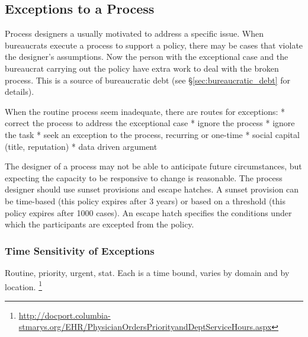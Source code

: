 \subsection{Exceptions to a Process\label{sec:exceptions-to-process}}


Process designers a usually motivated to address a specific issue. When bureaucrats execute a process to support a policy, there may be cases that violate the designer's assumptions. Now the person with the exceptional case and the bureaucrat carrying out the policy have extra work to deal with the broken process. This is a source of bureaucratic debt (see \S\ref{sec:bureaucratic_debt} for details). 

When the routine process seem inadequate, there are routes for exceptions:
* correct the process to address the exceptional case
* ignore the process
* ignore the task
* seek an exception to the process, recurring or one-time
  * social capital (title, reputation)
  * data driven argument 

The designer of a process may not be able to anticipate future circumstances, but expecting the capacity to be responsive to change is reasonable. The process designer should use sunset provisions and escape hatches.  
A sunset provision can be time-based (this policy expires after 3 years) or based on a threshold (this policy expires after 1000 cases). An escape hatch specifies the conditions under which the participants are excepted from the policy. 

\subsubsection{Time Sensitivity of Exceptions}
Routine, priority, urgent, stat. 
Each is a time bound, varies by domain and by location.
\footnote{\href{http://docport.columbia-stmarys.org/EHR/PhysicianOrdersPriorityandDeptServiceHours.aspx}{http://docport.columbia-stmarys.org/EHR/PhysicianOrdersPriorityandDeptServiceHours.aspx}}